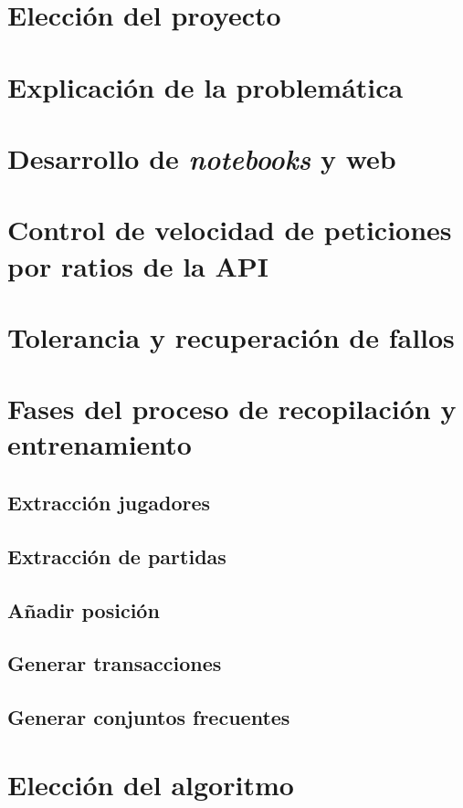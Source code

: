 
\section{Elección del proyecto}


\section{Explicación de la problemática}


\section{Desarrollo de \textit{notebooks} y web}


\section{Control de velocidad de peticiones por ratios de la API}


\section{Tolerancia y recuperación de fallos}


\section{Fases del proceso de recopilación y entrenamiento}

\subsection{Extracción jugadores}
\subsection{Extracción de partidas}
\subsection{Añadir posición}
\subsection{Generar transacciones}
\subsection{Generar conjuntos frecuentes}


\section{Elección del algoritmo}

